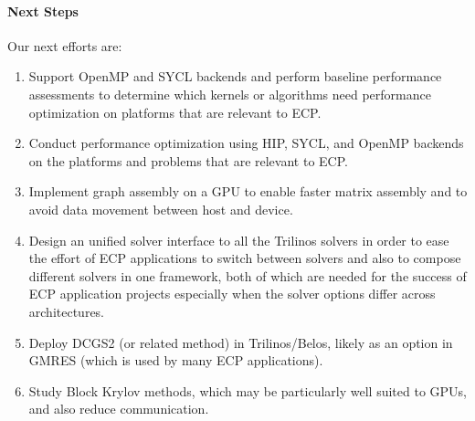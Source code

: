 \paragraph{Next Steps}
Our next efforts are:
\begin{enumerate}
\item Support OpenMP and SYCL backends and
      perform baseline performance assessments to determine which kernels or algorithms need performance optimization
      on platforms that are relevant to ECP.
\item Conduct performance optimization using HIP, SYCL, and OpenMP backends on the platforms and problems
      that are relevant to ECP.
\item Implement graph assembly on a GPU to enable faster matrix assembly and to avoid data movement between host and device.
\item Design an unified solver interface to all the Trilinos solvers in order to ease the effort of ECP applications
      to switch between solvers and also to compose different solvers in one framework, both of which are needed for the success of ECP application projects especially when the solver options differ across architectures.
\item Deploy DCGS2 (or related method) in Trilinos/Belos, likely as an option in GMRES (which is used by many ECP applications).
\item Study Block Krylov methods, which may be particularly well suited to GPUs, and also reduce communication.
\end{enumerate}

